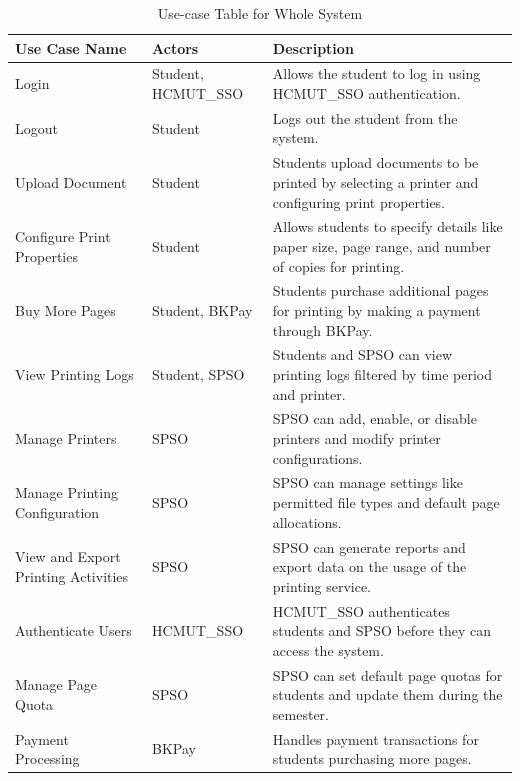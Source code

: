 \documentclass[a4paper]{report}
\begin{document}
\clearpage
\begin{table}[h!]
\centering
\renewcommand{\arraystretch}{1.8}
\begin{tabular}{|>{\raggedright\arraybackslash}p{3cm}|>{\centering\arraybackslash}p{3cm}|p{7cm}|}
\hline
\textbf{Use Case Name} & \textbf{Actors} & \textbf{Description} \\ \hline
Login & Student,  HCMUT\_SSO & Allows the student to log in using HCMUT\_SSO authentication. \\ \hline
Logout & Student & Logs out the student from the system. \\ \hline
Upload Document & Student & Students upload documents to be printed by selecting a printer and configuring print properties. \\ \hline
Configure Print Properties & Student & Allows students to specify details like paper size, page range, and number of copies for printing. \\ \hline
Buy More Pages & Student, BKPay & Students purchase additional pages for printing by making a payment through BKPay. \\ \hline
View Printing Logs & Student, SPSO & Students and SPSO can view printing logs filtered by time period and printer. \\ \hline
Manage Printers & SPSO & SPSO can add, enable, or disable printers and modify printer configurations. \\ \hline
Manage Printing Configuration & SPSO & SPSO can manage settings like permitted file types and default page allocations. \\ \hline
View and Export Printing Activities & SPSO & SPSO can generate reports and export data on the usage of the printing service. \\ \hline
Authenticate Users & HCMUT\_SSO & HCMUT\_SSO authenticates students and SPSO before they can access the system. \\ \hline
Manage Page Quota & SPSO & SPSO can set default page quotas for students and update them during the semester. \\ \hline
Payment Processing & BKPay & Handles payment transactions for students purchasing more pages. \\ [2ex] \hline
\end{tabular}
\caption{Use-case Table for Whole System}
\label{tab:use_case_table_whole_system}
\end{table}
\end{document}

